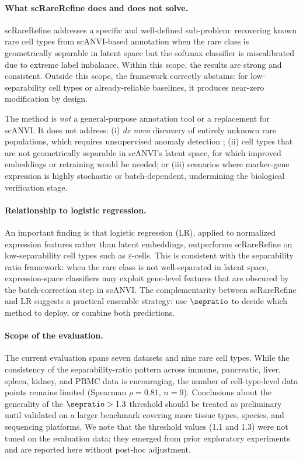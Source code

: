 \paragraph{What scRareRefine does and does not solve.}
scRareRefine addresses a specific and well-defined sub-problem: recovering known rare cell types from scANVI-based annotation when the rare class is geometrically separable in latent space but the softmax classifier is miscalibrated due to extreme label imbalance. Within this scope, the results are strong and consistent. Outside this scope, the framework correctly abstains: for low-separability cell types or already-reliable baselines, it produces near-zero modification by design.

The method is \emph{not} a general-purpose annotation tool or a replacement for scANVI. It does not address: (i) \emph{de novo} discovery of entirely unknown rare populations, which requires unsupervised anomaly detection \citep{xu2024scCAD,fang2021gapclust}; (ii) cell types that are not geometrically separable in scANVI's latent space, for which improved embeddings or retraining would be needed; or (iii) scenarios where marker-gene expression is highly stochastic or batch-dependent, undermining the biological verification stage.

\paragraph{Relationship to logistic regression.}
An important finding is that logistic regression (LR), applied to normalized expression features rather than latent embeddings, outperforms scRareRefine on low-separability cell types such as $\varepsilon$-cells. This is consistent with the separability ratio framework: when the rare class is not well-separated in latent space, expression-space classifiers may exploit gene-level features that are obscured by the batch-correction step in scANVI. The complementarity between scRareRefine and LR suggests a practical ensemble strategy: use $\sepratio$ to decide which method to deploy, or combine both predictions.

\paragraph{Scope of the evaluation.}
The current evaluation spans seven datasets and nine rare cell types. While the consistency of the separability-ratio pattern across immune, pancreatic, liver, spleen, kidney, and PBMC data is encouraging, the number of cell-type-level data points remains limited (Spearman $\rho = 0.81$, $n = 9$). Conclusions about the generality of the $\sepratio > 1.3$ threshold should be treated as preliminary until validated on a larger benchmark covering more tissue types, species, and sequencing platforms. We note that the threshold values (1.1 and 1.3) were not tuned on the evaluation data; they emerged from prior exploratory experiments and are reported here without post-hoc adjustment.

